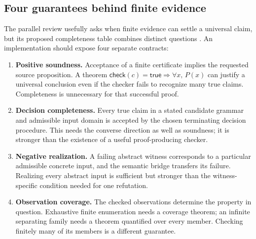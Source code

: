 \documentclass[11pt,letterpaper]{article}
\theoremstyle{definition}\newtheorem{definition}[proposition]{Definition}
\theoremstyle{remark}\newtheorem{remark}[proposition]{Remark}
\begin{document}
\subsection{Four guarantees behind finite evidence}\label{sec:finite-evidence}
The parallel review usefully asks when finite evidence can settle a universal
claim, but its proposed completeness table combines distinct questions
\cite[Section 9.2]{round3-peer}. An implementation should expose four separate
contracts:
\begin{enumerate}
\item \textbf{Positive soundness.} Acceptance of a finite certificate implies
the requested source proposition. A theorem
$\mathsf{check}(c)=\mathsf{true}\Rightarrow\forall x,\,P(x)$ can justify a
universal conclusion even if the checker fails to recognize many true claims.
Completeness is unnecessary for that successful proof.
\item \textbf{Decision completeness.} Every true claim in a stated candidate
grammar and admissible input domain is accepted by the chosen terminating
decision procedure. This needs the converse direction as well as soundness;
it is stronger than the existence of a useful proof-producing checker.
\item \textbf{Negative realization.} A failing abstract witness corresponds
to a particular admissible concrete input, and the semantic bridge transfers
its failure. Realizing every abstract input is sufficient but stronger than
the witness-specific condition needed for one refutation.
\item \textbf{Observation coverage.} The checked observations determine the
property in question. Exhaustive finite enumeration needs a coverage theorem;
an infinite separating family needs a theorem quantified over every member.
Checking finitely many of its members is a different guarantee.
\end{enumerate}
\end{document}

